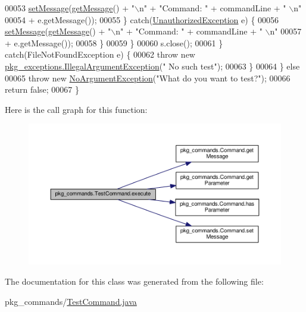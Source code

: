 \begin{DoxyCode}
00053                         \hyperlink{classpkg__commands_1_1Command_ae210ff216fe908b111ba1c988a963d13}{setMessage}(\hyperlink{classpkg__commands_1_1Command_ac2a42e2bab264821892daefaf9a18b6c}{getMessage}() + \textcolor{stringliteral}{"\(\backslash\)n"} + \textcolor{stringliteral}{"Command: "} + commandLine + \textcolor{stringliteral}{"
      \(\backslash\)n"}
00054                                 + e.getMessage());
00055                     \} \textcolor{keywordflow}{catch}(\hyperlink{classpkg__exceptions_1_1UnauthorizedException}{UnauthorizedException} e)  \{
00056                         \hyperlink{classpkg__commands_1_1Command_ae210ff216fe908b111ba1c988a963d13}{setMessage}(\hyperlink{classpkg__commands_1_1Command_ac2a42e2bab264821892daefaf9a18b6c}{getMessage}() + \textcolor{stringliteral}{"\(\backslash\)n"} + \textcolor{stringliteral}{"Command: "} + commandLine + \textcolor{stringliteral}{"
      \(\backslash\)n"}
00057                                 + e.getMessage());
00058                     \}
00059                 \}
00060                 s.close();
00061             \} \textcolor{keywordflow}{catch}(FileNotFoundException e) \{
00062                 \textcolor{keywordflow}{throw} \textcolor{keyword}{new} \hyperlink{classpkg__exceptions_1_1IllegalArgumentException}{pkg\_exceptions.IllegalArgumentException}(\textcolor{stringliteral}{"
      No such test"});
00063             \}
00064         \} \textcolor{keywordflow}{else}
00065             \textcolor{keywordflow}{throw} \textcolor{keyword}{new} \hyperlink{classpkg__exceptions_1_1NoArgumentException}{NoArgumentException}(\textcolor{stringliteral}{"What do you want to test?"});
00066         \textcolor{keywordflow}{return} \textcolor{keyword}{false};
00067     \}
\end{DoxyCode}


Here is the call graph for this function\-:
\nopagebreak
\begin{figure}[H]
\begin{center}
\leavevmode
\includegraphics[width=350pt]{classpkg__commands_1_1TestCommand_a1ff07c27a46910d20c2e4569888892ca_cgraph}
\end{center}
\end{figure}




The documentation for this class was generated from the following file\-:\begin{DoxyCompactItemize}
\item 
pkg\-\_\-commands/\hyperlink{TestCommand_8java}{Test\-Command.\-java}\end{DoxyCompactItemize}
